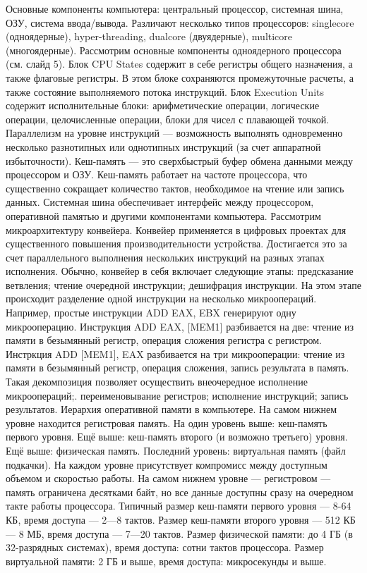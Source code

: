 \documentclass[14pt, a4paper, openany, twoside, draft]{extbook} %
\begin{document}
Основные компоненты компьютера: центральный процессор, системная шина, ОЗУ, система ввода/вывода. Различают несколько типов процессоров: singlecore (одноядерные), hyper-threading, dualcore (двуядерные), multicore (многоядерные).
Рассмотрим основные компоненты одноядерного процессора (см. слайд 5). Блок CPU States содержит в себе регистры общего назначения, а также флаговые регистры. В этом блоке сохраняются промежуточные расчеты, а также состояние выполняемого потока инструкций. Блок Execution Units содержит исполнительные блоки: арифметические операции, логические операции, целочисленные операции, блоки для чисел с плавающей точкой. Параллелизм на уровне инструкций — возможность выполнять одновременно несколько разнотипных или однотипных инструкций (за счет аппаратной избыточности). Кеш-память — это сверхбыстрый буфер обмена данными между процессором и ОЗУ. Кеш-память работает на частоте процессора, что существенно сокращает количество тактов, необходимое на чтение или запись данных. Системная шина обеспечивает интерфейс между процессором, оперативной памятью и другими компонентами компьютера.
Рассмотрим микроархитектуру конвейера. Конвейер применяется в цифровых проектах для существенного повышения производительности устройства. Достигается это за счет параллельного выполнения нескольких инструкций на разных этапах исполнения. Обычно, конвейер в себя включает следующие этапы:
предсказание ветвления;
чтение очередной инструкции;
дешифрация инструкции. На этом этапе происходит разделение одной инструкции на несколько микроопераций. Например, простые инструкции ADD EAX, EBX генерируют одну микрооперацию. Инструкция ADD EAX, [MEM1] разбивается на две: чтение из памяти в безымянный регистр, операция сложения регистра с регистром. Инстркция ADD [MEM1], EAX разбивается на три микрооперации: чтение из памяти в безымянный регистр, операция сложения, запись результата в память. Такая декомпозиция позволяет осуществить внеочередное исполнение микроопераций;.
переименовывание регистров;
исполнение инструкций;
запись результатов.
Иерархия оперативной памяти в компьютере. На самом нижнем уровне находится регистровая память. На один уровень выше: кеш-память первого уровня. Ещё выше: кеш-память второго (и возможно третьего) уровня. Ещё выше: физическая память. Последний уровень: виртуальная память (файл подкачки). На каждом уровне присутствует компромисс между доступным объемом и скоростью работы. На самом нижнем уровне — регистровом — память ограничена десятками байт, но все данные доступны сразу на очередном такте работы процессора. Типичный размер кеш-памяти первого уровня — 8-64 КБ, время доступа — 2—8 тактов. Размер кеш-памяти второго уровня — 512 КБ — 8 МБ, время доступа — 7—20 тактов. Размер физической памяти: до 4 ГБ (в 32-разрядных системах), время доступа: сотни тактов процессора. Размер виртуальной памяти: 2 ГБ и выше, время доступа: микросекунды и выше.
\end{document}
